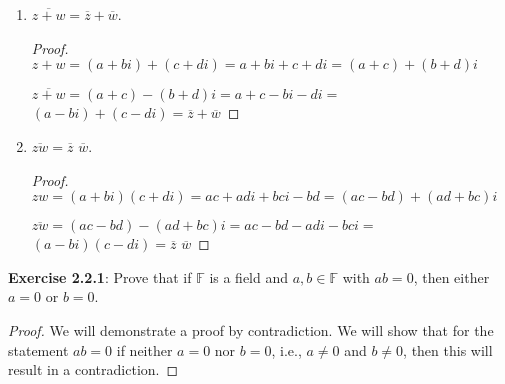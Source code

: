 \documentclass[a4paper]{article}
\begin{document}
\begin{myparindent}{0pt}
\begin{enumerate}[label=(\roman*)]
\begin{proof}
        $z + \overline{z} = (a + bi) + (a - bi) = 2a + bi - bi = 2a$ \newline

        Because $2 \in \mathbb{R}$ and $a \in \mathbb{R}$, and real numbers are
        closed under multiplication, $2a$ is also real, therefore
        $z + \overline{z}$ is real. \newline

        Next, we will prove that $z - \overline{z}$ is imaginary. \newline
        $z - \overline{z} = (a + bi) - (a - bi) = a - a + bi + bi = 2bi$. \newline

        Because $2 \in \mathbb{R}$ and $b \in \mathbb{R}$, and real numbers
        are closed under multiplication, then $2b \in \mathbb{R}$. Imaginary
        numbers are the set $\{ ci | c \in \mathbb{R} \}$. We can see that
        $2bi \in \{ ci | c \in \mathbb{R} \}$, therefore $z - \overline{z}$
        is imaginary.
    \end{proof}

  \item $\overline{z + w} = \overline{z} + \overline{w}$.
    \begin{proof}
        $z + w = (a + bi) + (c + di) = a + bi + c + di = (a + c) + (b + d)i$ \newline

        $\overline{z + w} = (a + c) - (b + d)i = a + c - bi - di = $
        $(a - bi) + (c - di) = \overline{z} + \overline{w}$
    \end{proof}

  \item $\overline{zw} = \overline{z}$ $\overline{w}$.
    \begin{proof}
        $zw = (a + bi)(c + di) = ac + adi + bci -bd = (ac - bd) + (ad + bc)i$ \newline

        $\overline{zw} = (ac - bd) - (ad + bc)i = ac - bd - adi - bci =$ \newline
        $(a - bi)(c - di) = \overline{z}$ $\overline{w}$
    \end{proof}
\end{enumerate}

\textbf{Exercise 2.2.1}:
Prove that if $\mathbb{F}$ is a field and $a, b \in \mathbb{F}$ with $ab = 0$,
then either $a = 0$ or $b = 0$.

\begin{proof}
  We will demonstrate a proof by contradiction. We will show that for the
  statement $ab = 0$ if neither $a = 0$ nor $b = 0$, i.e.,
  $a \ne 0$ and $b \ne 0$, then this will result in a contradiction. \newline


\end{proof}
\end{myparindent}
\end{document}
